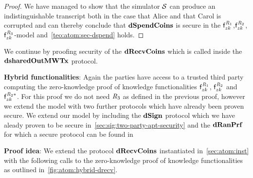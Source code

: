 \begin{proof}
    We have managed to show that the simulator $\mathcal{S}$ can produce an indistinguishable transcript both in the case that Alice and that Carol is corrupted and can thereby conclude that $\mathbf{dSpendCoins}$ is secure in the $\mathsf{f}^{\mathit{R}_1}_{zk}$,$\mathsf{f}^{\mathit{R}_2}_{zk}$,$\mathsf{f}^{\mathit{R}_3}_{zk}$-model and~\cref{teo:atom:sec-dspend} holds.
\end{proof}

We continue by proofing security of the $\mathbf{dRecvCoins}$ which is called inside the $\mathbf{dsharedOutMWTx}$ protocol.

\textbf{Hybrid functionalities}: Again the parties have access to a trusted third party computing the zero-knowledge proof of knowledge functionalities $\mathsf{f}^{\mathit{R}_1}_{zk}$, $\mathsf{f}^{\mathit{R}_2}_{zk}$ and $\mathsf{f}^{\mathit{R}_2*}_{zk}$.
For this proof we do not need $\mathit{R}_3$ as defined in the previous proof, however we extend the model with two further protocols which have already been proven secure.
We extend our model by including the $\mathbf{dSign}$ protocol which we have aleady proven to be secure in~\cref{sec:sig:two-party-apt-security} and the $\mathbf{dRanPrf}$ for which a secure protocol can be found in~\cite{klinec2020privacy}

\textbf{Proof idea}: We extend the protocol $\mathbf{dRecvCoins}$ instantiated in~\cref{sec:atom:inst} with the following calls to the zero-knowledge proof of knowledge functionalities as outlined in~\cref{fig:atom:hybrid-drecv}.

